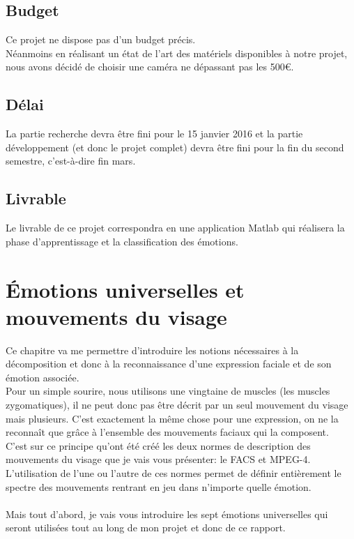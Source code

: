 \documentclass[poster]{polytech/polytech}
\begin{document}
\section{Budget}
Ce projet ne dispose pas d'un budget précis.\\
Néanmoins en réalisant un état de l'art des matériels disponibles à notre projet, nous avons décidé de choisir une caméra ne dépassant pas les 500€.

\section{Délai}
La partie recherche devra être fini pour le 15 janvier 2016 et la partie développement (et donc le projet complet) devra être fini pour la fin du second semestre, c'est-à-dire fin mars.

\section{Livrable}
Le livrable de ce projet correspondra en une application Matlab qui réalisera la phase d'apprentissage et la classification des émotions.

\chapter{Émotions universelles et \mbox{mouvements} du visage}
\label{chap:chap_emotions}

Ce chapitre va me permettre d'introduire les notions nécessaires à la décomposition et donc à la reconnaissance d'une expression faciale et de son émotion associée.\\
Pour un simple sourire, nous utilisons une vingtaine de muscles (les muscles zygomatiques), il ne peut donc pas être décrit par un seul mouvement du visage mais plusieurs. C'est exactement la même chose pour une expression, on ne la reconnaît que grâce à l'ensemble des mouvements faciaux qui la composent.\\
C'est sur ce principe qu'ont été créé les deux normes de description des mouvements du visage que je vais vous présenter: le FACS et MPEG-4.\\
L'utilisation de l'une ou l'autre de ces normes permet de définir entièrement le spectre des mouvements rentrant en jeu dans n'importe quelle émotion.\\
\\
Mais tout d'abord, je vais vous introduire les sept émotions universelles qui seront utilisées tout au long de mon projet et donc de ce rapport.
\end{document}

